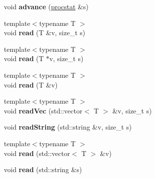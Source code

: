 \begin{DoxyCompactItemize}
\item 
\hypertarget{classfaster_1_1fastCommBuffer_a32d131a02dd0617af63568d0c1f1d34d}{}void {\bfseries advance} (\hyperlink{classfaster_1_1procstat}{procstat} \&s)\label{classfaster_1_1fastCommBuffer_a32d131a02dd0617af63568d0c1f1d34d}

\item 
\hypertarget{classfaster_1_1fastCommBuffer_add86f6104e056f605ac080438ddf58f4}{}{\footnotesize template$<$typename T $>$ }\\void {\bfseries read} (T \&v, size\+\_\+t s)\label{classfaster_1_1fastCommBuffer_add86f6104e056f605ac080438ddf58f4}

\item 
\hypertarget{classfaster_1_1fastCommBuffer_aad2acb51374cc1fac0bc46ee6810bc50}{}{\footnotesize template$<$typename T $>$ }\\void {\bfseries read} (T $\ast$v, size\+\_\+t s)\label{classfaster_1_1fastCommBuffer_aad2acb51374cc1fac0bc46ee6810bc50}

\item 
\hypertarget{classfaster_1_1fastCommBuffer_a69122ec66b22498052126f359c5bd6f4}{}{\footnotesize template$<$typename T $>$ }\\void {\bfseries read} (T \&v)\label{classfaster_1_1fastCommBuffer_a69122ec66b22498052126f359c5bd6f4}

\item 
\hypertarget{classfaster_1_1fastCommBuffer_a216070c6f8d5070154a50f40b7896add}{}{\footnotesize template$<$typename T $>$ }\\void {\bfseries read\+Vec} (std\+::vector$<$ T $>$ \&v, size\+\_\+t s)\label{classfaster_1_1fastCommBuffer_a216070c6f8d5070154a50f40b7896add}

\item 
\hypertarget{classfaster_1_1fastCommBuffer_a41bb4e65b2fb070761be378ce2b3601a}{}void {\bfseries read\+String} (std\+::string \&v, size\+\_\+t s)\label{classfaster_1_1fastCommBuffer_a41bb4e65b2fb070761be378ce2b3601a}

\item 
\hypertarget{classfaster_1_1fastCommBuffer_a95cf508e01224680a336c5f20e24ae4a}{}{\footnotesize template$<$typename T $>$ }\\void {\bfseries read} (std\+::vector$<$ T $>$ \&v)\label{classfaster_1_1fastCommBuffer_a95cf508e01224680a336c5f20e24ae4a}

\item 
\hypertarget{classfaster_1_1fastCommBuffer_aacf66de0fb075c3a588d86a266c7bb8e}{}void {\bfseries read} (std\+::string \&s)\label{classfaster_1_1fastCommBuffer_aacf66de0fb075c3a588d86a266c7bb8e}


\end{DoxyCompactItemize}
